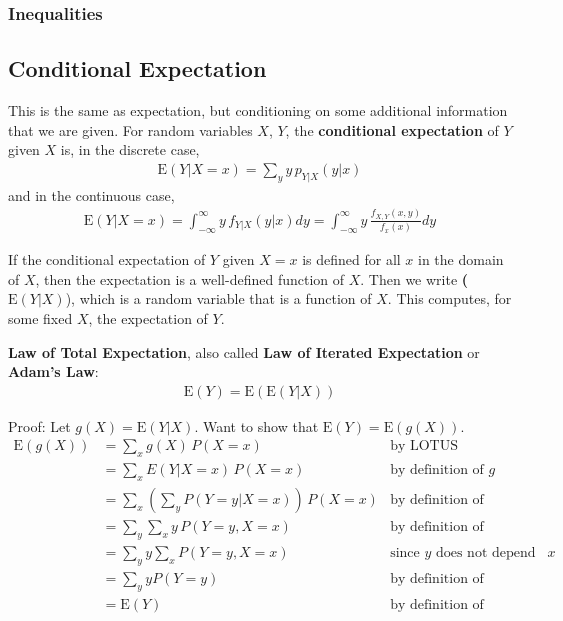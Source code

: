\documentclass[a4paper,10pt]{article}
\newcommand{\E}{\mathrm{E}}
\begin{document}
\subsubsection{Inequalities}

\subsection{Conditional Expectation}

This is the same as expectation, but conditioning on some additional information that we are given. For random variables $X$, $Y$, the \textbf{conditional expectation} of $Y$ given $X$ is, in the discrete case, 
\begin{align*}
    \E(Y|X=x) = \sum_y y\,p_{Y|X}(y|x)
\end{align*}
and in the continuous case,
\begin{align*}
    \E(Y|X=x) = \int_{-\infty}^{\infty} y\,f_{Y|X}(y|x)dy = \int_{-\infty}^{\infty} y\,\frac{f_{X, Y}(x, y)}{f_x(x)}dy
\end{align*}

If the conditional expectation of $Y$ given $X=x$ is defined for all $x$ in the domain of $X$, then the expectation is a well-defined function of $X$. Then we write \textbf($\E(Y|X)$), which is a random variable that is a function of $X$. This computes, for some fixed $X$, the expectation of $Y$. 

\textbf{Law of Total Expectation}, also called \textbf{Law of Iterated Expectation} or \textbf{Adam's Law}: 
\begin{align*}
    \E(Y) = \E(\E(Y|X))
\end{align*}

Proof: Let $g(X) = \E(Y|X)$. Want to show that $\E(Y) = \E(g(X))$. 
\begin{align*}
    \E(g(X)) &= \sum_x g(X)\,P(X=x) &\text{by LOTUS} \\
    &= \sum_x E(Y|X=x)\,P(X=x) &\text{by definition of $g$}\\
    &= \sum_x \left(\sum_y P(Y=y|X=x)\right)\,P(X=x) &\text{by definition of expectation} \\
    &= \sum_y \sum_x y\,P(Y=y, X=x) &\text{by definition of the joint PMF and swapping order of summation} \\
    &= \sum_y y \sum_x P(Y=y, X=x) &\text{since $y$ does not depend on $x$} \\
    &= \sum_y y P(Y=y) &\text{by definition of the marginal PMF} \\
    &= \E(Y) &\text{by definition of expectation}
\end{align*}
\end{document}
